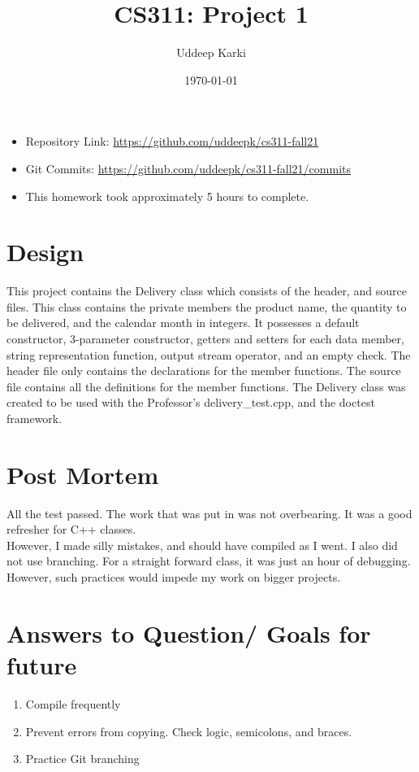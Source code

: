 \documentclass{article}
\title{\bfseries CS311: Project 1}
\author{Uddeep Karki}
\date{\today}
\begin{document}
\maketitle

\begin{itemize}
\item Repository Link:
  \url{https://github.com/uddeepk/cs311-fall21}

\item Git Commits:
  \url{https://github.com/uddeepk/cs311-fall21/commits}

  \item This homework took approximately 5 hours to complete.  
\end{itemize}

\section{Design}

This project contains the Delivery class which consists of the header, and source files. This class contains the private members the product name, the quantity to be delivered, and the calendar month in integers. It possesses a default constructor, 3-parameter constructor, getters and setters for each data member, string representation function, output stream operator, and an empty check. The header file only contains the declarations for the member functions. The source file contains all the definitions for the member functions. The Delivery class was created to be used with the Professor's delivery\_test.cpp, and the doctest framework.

\section{Post Mortem}

All the test passed. The work that was put in was not overbearing. It was a good refresher for C++ classes. \\
However, I made silly mistakes, and should have compiled as I went. I also did not use branching. For a straight forward class, it was just an hour of debugging. However, such practices would impede my work on bigger projects.

\section{Answers to Question/ Goals for future}

\begin{enumerate}
\item Compile frequently
\item Prevent errors from copying. Check logic, semicolons, and braces.
\item Practice Git branching
  
\end{enumerate}
\end{document}
